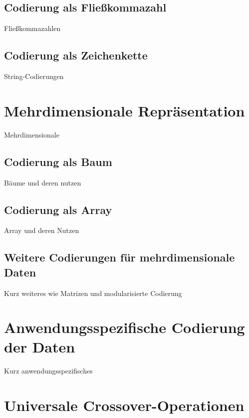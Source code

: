 \documentclass{llncs}
\begin{document}
	\subsection{Codierung als Fließkommazahl}
	\label{sec:FloatCod}
	
		Fließkommazahlen
	
	\subsection{Codierung als Zeichenkette}
	\label{sec:StrCod}
	
		String-Codierungen

\section{Mehrdimensionale Repräsentation}
\label{sec:MehrdimRep}

	Mehrdimensionale

	\subsection{Codierung als Baum}
	\label{sec:BaumCod}
	
		Bäume und deren nutzen
	
	\subsection{Codierung als Array}
	\label{sec:ArrayCod}
	
		Array und deren Nutzen
	
	\subsection{Weitere Codierungen für mehrdimensionale Daten}
	\label{sec:WeitereMehrdimensionale}
	
		Kurz weiteres wie Matrizen und modularisierte Codierung

\section{Anwendungsspezifische Codierung der Daten}
\label{sec:AnwendungsspezifischeCod}

	Kurz anwendungsspezifisches

\section{Universale Crossover-Operationen}
\label{sec:UniversaleOp}
\end{document}

